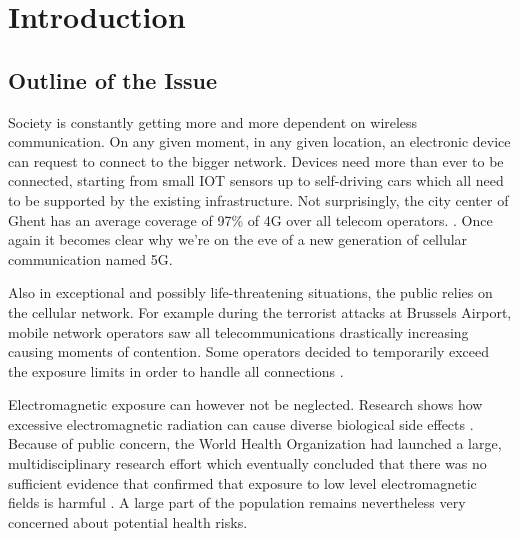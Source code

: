 \chapter{Introduction}
\label{chap:intro}

\section{Outline of the Issue} %
\label{sec:issue}

Society is constantly getting more and more dependent on wireless communication. On any given moment, in any given location, an electronic device
can request to connect to the bigger network. Devices need more than ever to be connected, starting from small IOT sensors up to self-driving cars
which all need to be supported by the existing infrastructure. 
Not surprisingly, the city center of Ghent has an average coverage of 97\% of 4G over all telecom operators.
\cite{testaankoop}. Once again it becomes clear why we're on the eve of a new generation of cellular communication named 5G. 

Also in exceptional and possibly life-threatening situations, the public relies on the cellular network. For example during the terrorist attacks at Brussels Airport,
mobile network operators saw all telecommunications drastically increasing causing moments of contention. Some operators decided to temporarily exceed the exposure limits in
order to handle all connections \cite{baseZaventem}.

Electromagnetic exposure can however not be neglected. Research shows how excessive electromagnetic radiation can cause diverse biological side effects \cite{bioeffects}.
Because of public concern, the World Health Organization had launched a large, multidisciplinary research effort which eventually concluded that there was no sufficient evidence that confirmed 
that exposure to low level electromagnetic fields is harmful \cite{WHO}. A large part of the population remains nevertheless very concerned about potential health risks.

